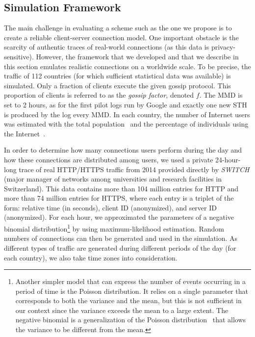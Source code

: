 \subsection{Simulation Framework}\label{sec:simulation_framework}

The main challenge in evaluating a scheme such as the one we propose is to create
a reliable client-server connection model. One important obstacle is the scarcity of
authentic traces of real-world connections (as this data is
privacy-sensitive). However, the framework that we developed and that we describe in this section
emulates realistic connections on a worldwide scale. To be precise, the traffic
of 112 countries (for which sufficient statistical data was available) is
simulated. Only a fraction of clients execute the given gossip protocol. This
proportion of clients is referred to as the \emph{gossip factor}, denoted $f$.
The MMD is set to 2 hours, as for the first pilot logs run by Google and
exactly one new STH is produced by the log every MMD. In each country, the number
of Internet users was estimated with the total population~\cite{population2014} and
the percentage of individuals using the Internet~\cite{internet-usage2012}.

In order to determine how many connections users perform during the day and how
these connections are distributed among users, we used a private 24-hour-long trace of
real HTTP/HTTPS traffic from 2014 provided directly by \emph{SWITCH}
(major manager of networks among universities and research facilities in Switzerland).
This data contains more than 104 million entries for HTTP and more than 74 million
entries for HTTPS, where each entry is a triplet of the form: relative time
(in seconds), client ID (anonymized), and server ID (an\-onym\-ized).
For each hour, we approximated the parameters of a negative
binomial distribution\footnote{Another simpler model that can express the number
of events occurring in a period of time is the Poisson distribution. It relies
on a single parameter that corresponds to both the variance and the mean, but
this is not sufficient in our context since the variance
exceeds the mean to a large extent. The negative binomial is a
generalization of the Poisson distribution~\cite{cameron2013regression} that
allows the variance to be different from the mean.}
by using maximum-likelihood estimation.
Random numbers of connections can then be generated and used in the simulation.
As different types of traffic are generated during different periods
of the day (for each country), we also take time zones into consideration.

